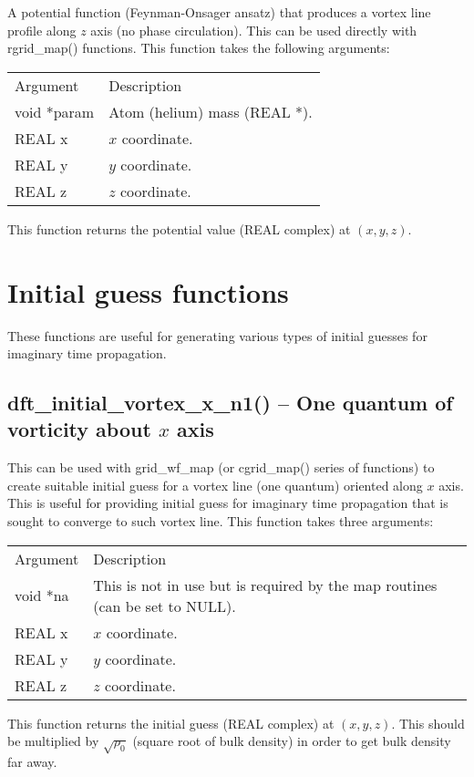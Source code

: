 \documentclass[12pt,letterpaper]{report}
\begin{document}
A potential function (Feynman-Onsager ansatz) that produces a vortex line profile along $z$ axis (no phase circulation). This can be used directly with rgrid\_map() functions. This function takes the following arguments:
\begin{longtable}{p{} p{}}
Argument & Description\\
\cline{1-2}
void *param & Atom (helium) mass (REAL *).\\
REAL x & $x$ coordinate.\\
REAL y & $y$ coordinate.\\
REAL z & $z$ coordinate.\\
\end{longtable}
\noindent
This function returns the potential value (REAL complex) at $(x, y, z)$. 

\section{Initial guess functions}

These functions are useful for generating various types of initial guesses for imaginary time propagation.

\subsection{dft\_initial\_vortex\_x\_n1() -- One quantum of vorticity about $x$ axis}

This can be used with grid\_wf\_map (or cgrid\_map() series of functions) to create suitable initial guess for a vortex line (one quantum) oriented along $x$ axis. This is useful for providing initial guess for imaginary time propagation that is sought to converge to such vortex line. This function takes three arguments:
\begin{longtable}{p{} p{}}
Argument & Description\\
\cline{1-2}
void *na & This is not in use but is required by the map routines (can be set to NULL).\\
REAL x & $x$ coordinate.\\
REAL y & $y$ coordinate.\\
REAL z & $z$ coordinate.\\
\end{longtable}
\noindent
This function returns the initial guess (REAL complex) at $(x, y, z)$. This should be multiplied by $\sqrt{\rho_0}$ (square root of bulk density) in order to get bulk density far away. 
\end{document}
